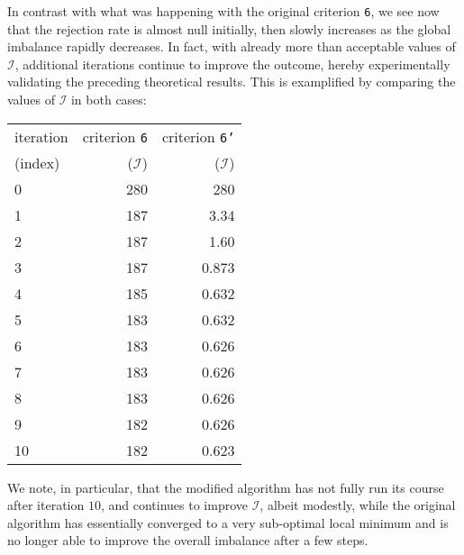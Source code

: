 In contrast with what was happening with the original criterion
\texttt{6}, we see now that the rejection rate is almost null
initially, then slowly increases as the global imbalance rapidly decreases.
In fact, with already more than acceptable values of $\mathcal{I}$,
additional iterations continue to improve the outcome, hereby
experimentally validating the preceding theoretical results. This is
examplified by comparing the values of $\mathcal{I}$ in both cases:
\begin{center}
\begin{tabular}{@{}lrr@{}}
\hline
iteration & criterion \texttt{6}  & criterion \texttt{6'} \\
(index)   & ($\mathcal{I}$) & ($\mathcal{I}$) \\
\hline\hline
 0 & 280 &   280\\
 1 & 187 &  3.34\\
 2 & 187 &  1.60\\
 3 & 187 & 0.873\\
 4 & 185 & 0.632\\
 5 & 183 & 0.632 \\
 6 & 183 & 0.626 \\
 7 & 183 & 0.626 \\
 8 & 183 & 0.626 \\
 9 & 182 & 0.626 \\
10 & 182 & 0.623 \\
\hline
\end{tabular}
\end{center}
We note, in particular, that the modified algorithm has not fully run
its course after iteration $10$, and continues to improve
$\mathcal{I}$, albeit modestly, while the original algorithm has
essentially converged to a very sub-optimal local minimum and is no
longer able to improve the overall imbalance after a few steps.
